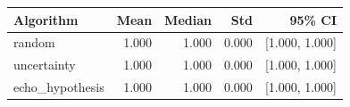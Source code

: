 \begin{tabular}{lrrrr}
\hline
Algorithm & Mean & Median & Std & 95\% CI \\
\hline
random & 1.000 & 1.000 & 0.000 & [1.000, 1.000] \\
uncertainty & 1.000 & 1.000 & 0.000 & [1.000, 1.000] \\
echo\_hypothesis & 1.000 & 1.000 & 0.000 & [1.000, 1.000] \\
\hline
\end{tabular}
